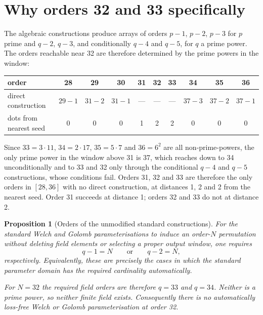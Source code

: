 \documentclass[11pt,a4paper,oneside]{report}
\newtheorem{proposition}[theorem]{Proposition}
\theoremstyle{definition}
\begin{document}
\section{Why orders 32 and 33 specifically}

The algebraic constructions produce arrays of orders $p-1$, $p-2$, $p-3$ for $p$
prime and $q-2$, $q-3$, and conditionally $q-4$ and $q-5$, for $q$ a prime
power. The orders reachable near 32 are therefore determined by the prime powers
in the window:

\begin{center}
\begin{tabular}{@{}lccccccccc@{}}
\toprule
order & 28 & 29 & 30 & \textbf{31} & \textbf{32} & \textbf{33} & 34 & 35 & 36 \\
\midrule
direct construction & $29{-}1$ & $31{-}2$ & $31{-}1$ & --- & --- & --- &
  $37{-}3$ & $37{-}2$ & $37{-}1$ \\
dots from nearest seed & 0 & 0 & 0 & 1 & 2 & 2 & 0 & 0 & 0 \\
\bottomrule
\end{tabular}
\end{center}

Since $33 = 3\cdot 11$, $34 = 2\cdot 17$, $35 = 5\cdot 7$ and $36 = 6^2$ are all
non-prime-powers, the only prime power in the window above 31 is 37, which
reaches down to 34 unconditionally and to 33 and 32 only through the conditional
$q-4$ and $q-5$ constructions, whose conditions fail. Orders 31, 32 and 33 are
therefore the only orders in $[28,36]$ with no direct construction, at distances
1, 2 and 2 from the nearest seed. Order 31 succeeds at distance 1; orders 32 and
33 do not at distance 2.

\begin{proposition}[Orders of the unmodified standard constructions]
\label{p1-prop:polydual}
For the standard Welch and Golomb parameterisations to induce an order-$N$
permutation without deleting field elements or selecting a proper output window,
one requires
\[
q-1=N \qquad\text{or}\qquad q-2=N,
\]
respectively. Equivalently, these are precisely the cases in which the standard
parameter domain has the required cardinality automatically.

For $N=32$ the required field orders are therefore $q=33$ and $q=34$. Neither is
a prime power, so neither finite field exists. Consequently there is no automatically loss-free Welch or Golomb parameterisation at order 32.
\end{proposition}
\end{document}
